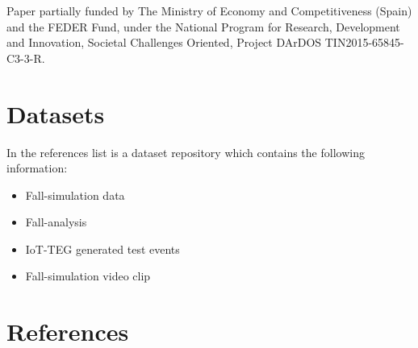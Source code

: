 \documentclass[review]{elsarticle}
\begin{document}
Paper partially funded by The Ministry of Economy and Competitiveness (Spain) and the FEDER Fund, under the National Program for Research, Development and Innovation, Societal Challenges Oriented, Project DArDOS TIN2015-65845-C3-3-R.


\section*{Datasets}
In the references list \cite{FallRepo} is a dataset repository which contains the following information:
\begin{itemize}
	\item Fall-simulation data
	\item Fall-analysis
	\item IoT-TEG generated test events
	\item Fall-simulation video clip
\end{itemize}
\newpage
\section*{References}


\end{document}
